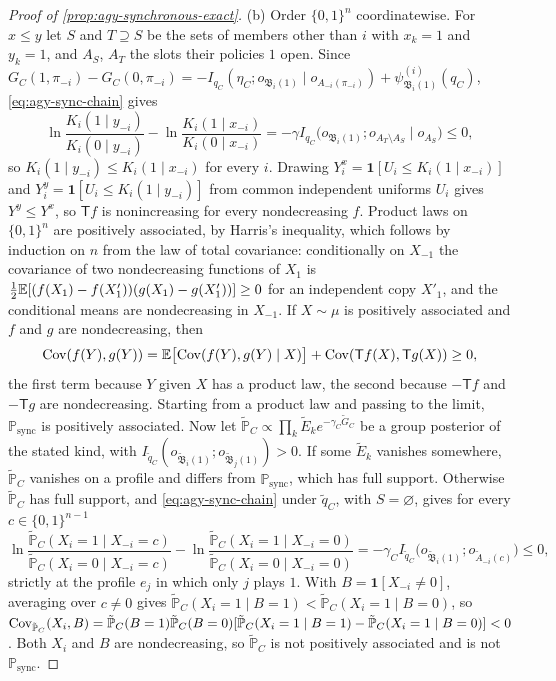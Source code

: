\begin{proof}[Proof of \cref{prop:agy-synchronous-exact}]
(b) Order $\{0,1\}^n$ coordinatewise. For $x\le y$ let $S$ and $T\supseteq S$ be the sets of members other than $i$ with $x_k=1$ and $y_k=1$, and $A_S$, $A_T$ the slots their policies $1$ open. Since $G_C(1,\pi_{-i})-G_C(0,\pi_{-i})=-I_{q_C}(\eta_C;o_{\mathfrak B_i(1)}\mid o_{A_{-i}(\pi_{-i})})+\psi^{(i)}_{\mathfrak B_i(1)}(q_C)$, \eqref{eq:agy-sync-chain} gives
\begin{equation*}
\ln\frac{K_i(1\mid y_{-i})}{K_i(0\mid y_{-i})}-\ln\frac{K_i(1\mid x_{-i})}{K_i(0\mid x_{-i})}=-\gamma I_{q_C}\bigl(o_{\mathfrak B_i(1)};o_{A_T\setminus A_S}\mid o_{A_S}\bigr)\le0,
\end{equation*}
so $K_i(1\mid y_{-i})\le K_i(1\mid x_{-i})$ for every $i$. Drawing $Y^x_i=\mathbf 1[U_i\le K_i(1\mid x_{-i})]$ and $Y^y_i=\mathbf 1[U_i\le K_i(1\mid y_{-i})]$ from common independent uniforms $U_i$ gives $Y^y\le Y^x$, so $\mathsf Tf$ is nonincreasing for every nondecreasing $f$. Product laws on $\{0,1\}^n$ are positively associated, by Harris's inequality, which follows by induction on $n$ from the law of total covariance: conditionally on $X_{-1}$ the covariance of two nondecreasing functions of $X_1$ is $\frac12\mathbb{E}[(f(X_1)-f(X'_1))(g(X_1)-g(X'_1))]\ge0$ for an independent copy $X'_1$, and the conditional means are nondecreasing in $X_{-1}$. If $X\sim\mu$ is positively associated and $f$ and $g$ are nondecreasing, then
\begin{equation*}
\operatorname{Cov}(f(Y),g(Y))=\mathbb{E}\bigl[\operatorname{Cov}(f(Y),g(Y)\mid X)\bigr]+\operatorname{Cov}(\mathsf Tf(X),\mathsf Tg(X))\ge0,
\end{equation*}
the first term because $Y$ given $X$ has a product law, the second because $-\mathsf Tf$ and $-\mathsf Tg$ are nondecreasing. Starting from a product law and passing to the limit, $\mathbb P_{\mathrm{sync}}$ is positively associated. Now let $\tilde{\mathbb P}_C\propto\prod_k\tilde E_ke^{-\gamma_C\tilde G_C}$ be a group posterior of the stated kind, with $I_{\tilde q_C}(o_{\tilde{\mathfrak B}_i(1)};o_{\tilde{\mathfrak B}_j(1)})>0$. If some $\tilde E_k$ vanishes somewhere, $\tilde{\mathbb P}_C$ vanishes on a profile and differs from $\mathbb P_{\mathrm{sync}}$, which has full support. Otherwise $\tilde{\mathbb P}_C$ has full support, and \eqref{eq:agy-sync-chain} under $\tilde q_C$, with $S=\varnothing$, gives for every $c\in\{0,1\}^{n-1}$
\begin{equation*}
\ln\frac{\tilde{\mathbb P}_C(X_i=1\mid X_{-i}=c)}{\tilde{\mathbb P}_C(X_i=0\mid X_{-i}=c)}-\ln\frac{\tilde{\mathbb P}_C(X_i=1\mid X_{-i}=0)}{\tilde{\mathbb P}_C(X_i=0\mid X_{-i}=0)}=-\gamma_CI_{\tilde q_C}\bigl(o_{\tilde{\mathfrak B}_i(1)};o_{\tilde A_{-i}(c)}\bigr)\le0,
\end{equation*}
strictly at the profile $e_j$ in which only $j$ plays $1$. With $B=\mathbf 1[X_{-i}\ne0]$, averaging over $c\ne0$ gives $\tilde{\mathbb P}_C(X_i=1\mid B=1)<\tilde{\mathbb P}_C(X_i=1\mid B=0)$, so $\operatorname{Cov}_{\tilde{\mathbb P}_C}(X_i,B)=\tilde{\mathbb P}_C(B=1)\tilde{\mathbb P}_C(B=0)[\tilde{\mathbb P}_C(X_i=1\mid B=1)-\tilde{\mathbb P}_C(X_i=1\mid B=0)]<0$. Both $X_i$ and $B$ are nondecreasing, so $\tilde{\mathbb P}_C$ is not positively associated and is not $\mathbb P_{\mathrm{sync}}$.
\end{proof}

